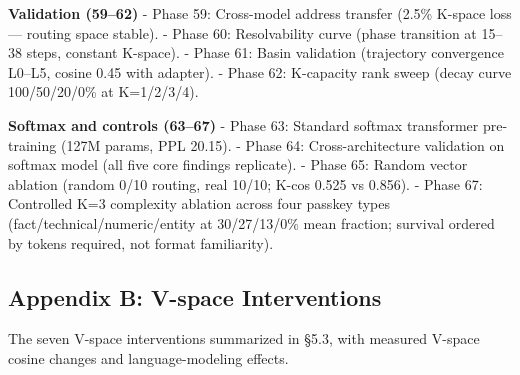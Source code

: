 \textbf{Validation (59--62)} - Phase 59: Cross-model address transfer (2.5\% K-space loss --- routing space stable). - Phase 60: Resolvability curve (phase transition at 15--38 steps, constant K-space). - Phase 61: Basin validation (trajectory convergence L0--L5, cosine 0.45 with adapter). - Phase 62: K-capacity rank sweep (decay curve 100/50/20/0\% at K=1/2/3/4).

\textbf{Softmax and controls (63--67)} - Phase 63: Standard softmax transformer pre-training (127M params, PPL 20.15). - Phase 64: Cross-architecture validation on softmax model (all five core findings replicate). - Phase 65: Random vector ablation (random 0/10 routing, real 10/10; K-cos 0.525 vs 0.856). - Phase 67: Controlled K=3 complexity ablation across four passkey types (fact/technical/numeric/entity at 30/27/13/0\% mean fraction; survival ordered by tokens required, not format familiarity).

\subsection{Appendix B: V-space Interventions}\label{appendix-b-v-space-interventions}

The seven V-space interventions summarized in §5.3, with measured V-space cosine changes and language-modeling effects.

